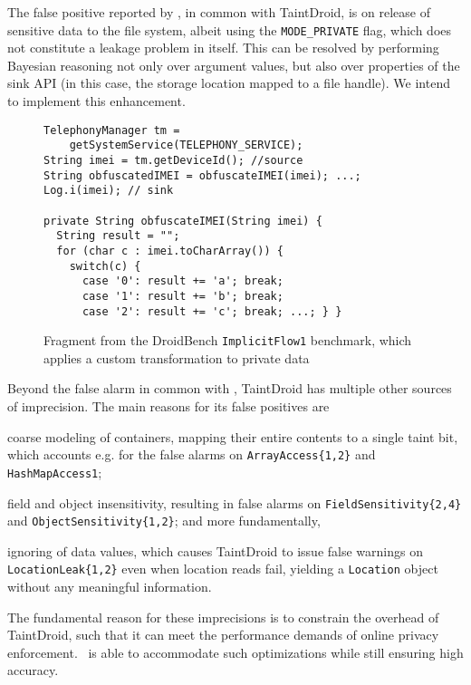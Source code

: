 The false positive reported by \Tool, in common with TaintDroid, is on release of sensitive data to the file system, albeit using the {\tt MODE\_PRIVATE} flag, which does not constitute a leakage problem in itself. This can be resolved by performing Bayesian reasoning not only over argument values, but also over properties of the sink API (in this case, the storage location mapped to a file handle). We intend to implement this enhancement.

\begin{figure}
\begin{lstlisting}
TelephonyManager tm =
    getSystemService(TELEPHONY_SERVICE);
String imei = tm.getDeviceId(); //source
String obfuscatedIMEI = obfuscateIMEI(imei); ...;
Log.i(imei); // sink

private String obfuscateIMEI(String imei) {
  String result = "";
  for (char c : imei.toCharArray()) {
    switch(c) {
      case '0': result += 'a'; break;
      case '1': result += 'b'; break;
      case '2': result += 'c'; break; ...; } }
\end{lstlisting}
\caption{\label{Fi:dataTransform} Fragment from the DroidBench {\tt ImplicitFlow1} benchmark, which applies a custom transformation to private data}
\end{figure}


Beyond the false alarm in common with \Tool, TaintDroid has multiple other sources of imprecision. The main reasons for its false positives are
\begin{compactitem}
	\item coarse modeling of containers, mapping their entire contents to a single taint bit, which accounts e.g. for the false alarms on {\tt ArrayAccess\{1,2\}} and {\tt HashMapAccess1};
	\item field and object insensitivity, resulting in false alarms on {\tt FieldSensitivity\{2,4\}} and {\tt ObjectSensitivity\{1,2\}}; and more fundamentally,
	\item ignoring of data values, which causes TaintDroid to issue false warnings on {\tt LocationLeak\{1,2\}} even when location reads fail, yielding a {\tt Location} object without any meaningful information.
\end{compactitem}
The fundamental reason for these imprecisions is to constrain the overhead of TaintDroid, such that it can meet the performance demands of online privacy enforcement. \Tool\ is able to accommodate such optimizations while still ensuring high accuracy. 